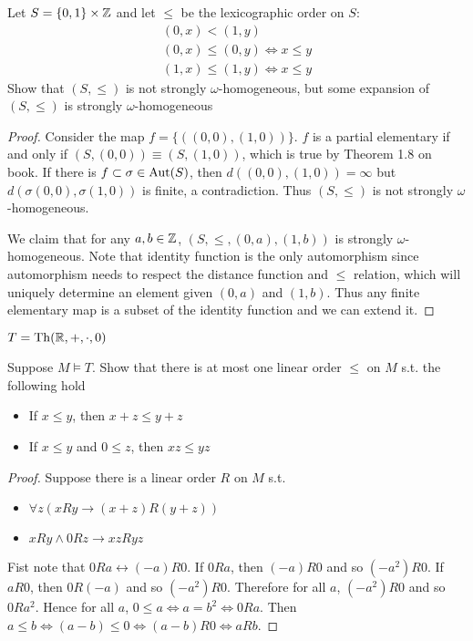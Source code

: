 \documentclass[11pt]{article}
\begin{document}
\begin{exercise}
Let \(S=\{0,1\}\times\mathbb{Z}\) and let \(\le\) be the lexicographic order on \(S\):
\begin{gather*}
(0,x)<(1,y)\\
(0,x)\le(0,y)\Leftrightarrow x\le y\\
(1,x)\le(1,y)\Leftrightarrow x\le y
\end{gather*}
Show that \((S,\le)\) is not strongly \(\omega\)-homogeneous, but some expansion of \((S,\le)\) is strongly \(\omega\)-homogeneous
\end{exercise}

\begin{proof}
Consider the map \(f=\{((0,0),(1,0))\}\). \(f\) is a partial elementary if and only
if \((S,(0,0))\equiv(S,(1,0))\), which is true by Theorem 1.8 on book. If there is \(f\subset\sigma\in\operatorname{\text{Aut}}(S)\), then
\(d((0,0),(1,0))=\infty\) but \(d(\sigma(0,0),\sigma(1,0))\) is finite, a contradiction. Thus \((S,\le)\) is not
strongly \(\omega\)-homogeneous.

We claim that for any \(a,b\in\mathbb{Z}\), \((S,\le,(0,a),(1,b))\) is strongly \(\omega\)-homogeneous. Note that identity
function is the only automorphism since automorphism needs to respect the distance function
and \(\le\) relation, which will uniquely determine an element given \((0,a)\) and \((1,b)\). Thus any
finite elementary map is a subset of the identity function and we can extend it.
\end{proof}

\(T=\operatorname{Th}(\mathbb{R},+,\cdot,0)\)

\begin{exercise}
Suppose \(M\vDash T\). Show that there is at most one linear order \(\le\) on \(M\) s.t. the following hold
\begin{itemize}
\item If \(x\le y\), then \(x+z\le y+z\)
\item If \(x\le y\) and \(0\le z\), then \(xz\le yz\)
\end{itemize}
\end{exercise}

\begin{proof}
Suppose there is a linear order \(R\) on \(M\) s.t.
\begin{itemize}
\item \(\forall z(xRy\to(x+z)R(y+z))\)
\item \(xRy\wedge 0Rz\to xzRyz\)
\end{itemize}

Fist note that \(0Ra\leftrightarrow(-a)R0\). If \(0Ra\), then \((-a)R0\) and so \((-a^2)R0\). If \(aR0\),
then \(0R(-a)\) and so \((-a^2)R0\). Therefore for all \(a\), \((-a^2)R0\) and so \(0Ra^2\). Hence
for all \(a\), \(0\le a\Leftrightarrow a=b^2\Leftrightarrow 0Ra\). Then \(a\le b\Leftrightarrow (a-b)\le 0\Leftrightarrow(a-b)R0\Leftrightarrow aRb\).
\end{proof}
\end{document}
